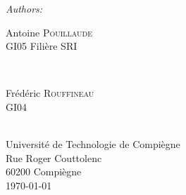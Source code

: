 \documentclass[a4paper, 11pt,twoside, leqno]{report}
\theoremstyle{plain}
\begin{document}
\begin{titlepage}
\emph{Authors:}\\[0.7cm]
\begin{minipage}{0.4\textwidth}
\begin{flushleft} \large
Antoine \textsc{Pouillaude} \\ %
GI05 Filière SRI
\end{flushleft}
\end{minipage}
~
\begin{minipage}{0.4\textwidth}
\begin{flushright} \large
Frédéric \textsc{Rouffineau} \\%
GI04
\end{flushright}
\end{minipage}\\[3cm]


 

Université de Technologie de Compiègne\\
Rue Roger Couttolenc\\
60200 Compiègne\\[2cm] %


{\large \today}\\[3cm] %

\vfill %

\end{titlepage}
\tableofcontents
\end{document}
